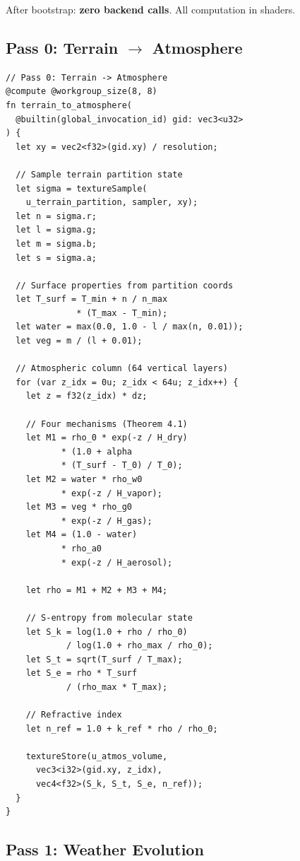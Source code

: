 \documentclass[10pt,twocolumn]{article}
\theoremstyle{definition}
\theoremstyle{remark}
\begin{document}
After bootstrap: \textbf{zero backend calls}.  All computation
in shaders.

\subsection{Pass 0: Terrain $\to$ Atmosphere}
\label{sec:pass0}

\begin{lstlisting}[style=wgsl,caption={Pass 0: Terrain to
  atmosphere coupling (compute shader).},
  label={lst:pass0}]
// Pass 0: Terrain -> Atmosphere
@compute @workgroup_size(8, 8)
fn terrain_to_atmosphere(
  @builtin(global_invocation_id) gid: vec3<u32>
) {
  let xy = vec2<f32>(gid.xy) / resolution;

  // Sample terrain partition state
  let sigma = textureSample(
    u_terrain_partition, sampler, xy);
  let n = sigma.r;
  let l = sigma.g;
  let m = sigma.b;
  let s = sigma.a;

  // Surface properties from partition coords
  let T_surf = T_min + n / n_max
              * (T_max - T_min);
  let water = max(0.0, 1.0 - l / max(n, 0.01));
  let veg = m / (l + 0.01);

  // Atmospheric column (64 vertical layers)
  for (var z_idx = 0u; z_idx < 64u; z_idx++) {
    let z = f32(z_idx) * dz;

    // Four mechanisms (Theorem 4.1)
    let M1 = rho_0 * exp(-z / H_dry)
           * (1.0 + alpha
           * (T_surf - T_0) / T_0);
    let M2 = water * rho_w0
           * exp(-z / H_vapor);
    let M3 = veg * rho_g0
           * exp(-z / H_gas);
    let M4 = (1.0 - water)
           * rho_a0
           * exp(-z / H_aerosol);

    let rho = M1 + M2 + M3 + M4;

    // S-entropy from molecular state
    let S_k = log(1.0 + rho / rho_0)
            / log(1.0 + rho_max / rho_0);
    let S_t = sqrt(T_surf / T_max);
    let S_e = rho * T_surf
            / (rho_max * T_max);

    // Refractive index
    let n_ref = 1.0 + k_ref * rho / rho_0;

    textureStore(u_atmos_volume,
      vec3<i32>(gid.xy, z_idx),
      vec4<f32>(S_k, S_t, S_e, n_ref));
  }
}
\end{lstlisting}

\subsection{Pass 1: Weather Evolution}\label{sec:pass1}
\end{document}
